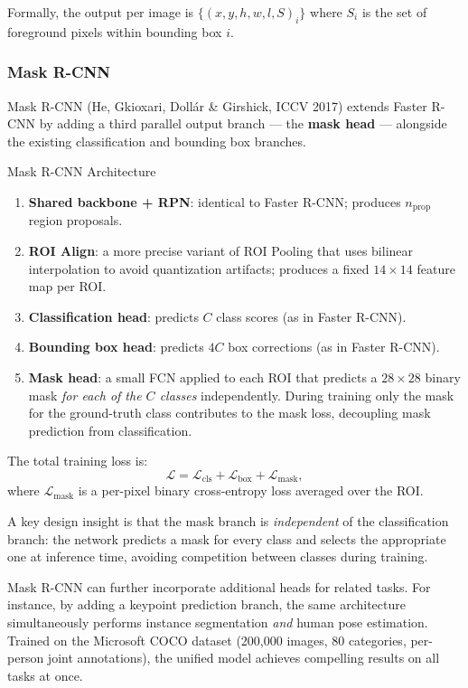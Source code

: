 \documentclass[11pt,a4paper]{article}
\newcommand{\term}[1]{\textcolor{DefGreen}{\textbf{#1}}}
\begin{document}
Formally, the output per image is $\{(x, y, h, w, l, S)_i\}$ where $S_i$ is the set of foreground pixels within bounding box $i$.

\subsubsection{Mask R-CNN}

Mask R-CNN (He, Gkioxari, Dollár \& Girshick, ICCV 2017) extends Faster R-CNN by adding a third parallel output branch — the \term{mask head} — alongside the existing classification and bounding box branches.

\begin{thmbox}{Mask R-CNN Architecture}
\begin{enumerate}
  \item \textbf{Shared backbone + RPN}: identical to Faster R-CNN; produces $n_\text{prop}$ region proposals.
  \item \textbf{ROI Align}: a more precise variant of ROI Pooling that uses bilinear interpolation to avoid quantization artifacts; produces a fixed $14 \times 14$ feature map per ROI.
  \item \textbf{Classification head}: predicts $C$ class scores (as in Faster R-CNN).
  \item \textbf{Bounding box head}: predicts $4C$ box corrections (as in Faster R-CNN).
  \item \textbf{Mask head}: a small FCN applied to each ROI that predicts a $28 \times 28$ binary mask \emph{for each of the $C$ classes} independently. During training only the mask for the ground-truth class contributes to the mask loss, decoupling mask prediction from classification.
\end{enumerate}
The total training loss is:
\[
  \mathcal{L} = \mathcal{L}_\text{cls} + \mathcal{L}_\text{box} + \mathcal{L}_\text{mask},
\]
where $\mathcal{L}_\text{mask}$ is a per-pixel binary cross-entropy loss averaged over the ROI.
\end{thmbox}

A key design insight is that the mask branch is \emph{independent} of the classification branch: the network predicts a mask for every class and selects the appropriate one at inference time, avoiding competition between classes during training.

Mask R-CNN can further incorporate additional heads for related tasks. For instance, by adding a keypoint prediction branch, the same architecture simultaneously performs instance segmentation \emph{and} human pose estimation. Trained on the Microsoft COCO dataset (200,000 images, 80 categories, per-person joint annotations), the unified model achieves compelling results on all tasks at once.
\end{document}
